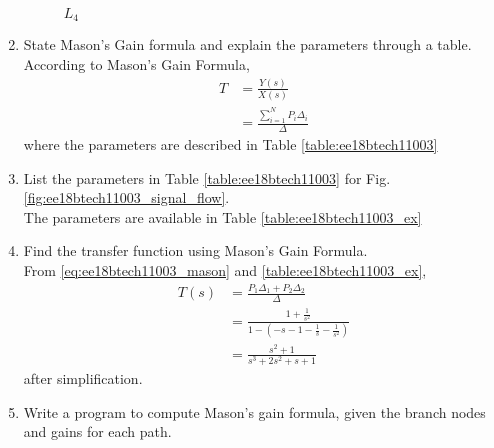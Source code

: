 \begin{enumerate}[label=\thesection.\arabic*.,ref=\thesection.\theenumi]
\begin{figure}[!ht]
\begin{center}
		\resizebox{\columnwidth}{!}{}
	\end{center}
\caption{$L_4$}
\label{fig:ee18btech11003_L4}
\end{figure}

\renewcommand{\thefigure}{\theenumi}

\item State Mason's Gain formula and explain the parameters through a table.
\\
\solution 
According to Mason's Gain Formula,
\begin{align}
T &= \frac{Y(s)}{X(s)} 
\\
 &= \frac{\sum_{i=1}^{N} P_i\Delta_i}{\Delta}
\label{eq:ee18btech11003_mason}
\end{align}
%
where the parameters are described in Table \ref{table:ee18btech11003}
\begin{table}[!ht]
\centering

\caption{}
\label{table:ee18btech11003}
\end{table}
\item List the parameters in Table \ref{table:ee18btech11003}
for Fig. \ref{fig:ee18btech11003_signal_flow}.
\\
\solution The parameters are available in Table \ref{table:ee18btech11003_ex}

\begin{table}[!ht]
\centering

\caption{}
\label{table:ee18btech11003_ex}
\end{table}

\item  Find the transfer function using Mason's Gain Formula.
\renewcommand{\thefigure}{\theenumi.\arabic{figure}}
%
\\
\solution From \eqref{eq:ee18btech11003_mason} and \ref{table:ee18btech11003_ex},
\begin{align}
T(s)&=\frac{P_1 \Delta_1+P_2 \Delta_2}{\Delta}
\\
&=\frac{1 +\frac{1}{s^2}}{1-(-s-1-\frac{1}{s}-\frac{1}{s^2})}
\\
&=\frac{s^2+1}{s^3+2s^2+s+1}
\end{align}
%
after simplification.
\renewcommand{\thefigure}{\theenumi}
\item Write a program to compute Mason's gain formula, given the branch nodes and gains for each path.
\end{enumerate}
